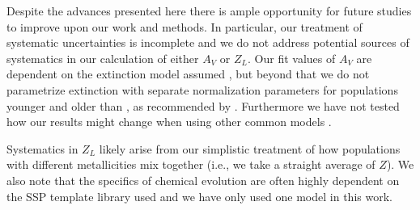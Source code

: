 

Despite the advances presented here there is ample opportunity for
future studies to improve upon our work and methods. In particular,
our treatment of systematic uncertainties is incomplete and we do not
address potential sources of systematics in our calculation of either
$A_V$ or $Z_L$. Our fit values of $A_V$ are dependent on the
extinction model assumed \citep[i.e.,][]{Charlot00}, but beyond that
we do not parametrize extinction with separate normalization
parameters for populations younger and older than ,
as recommended by \citet{Charlot00}. Furthermore we have not tested
how our results might change when using other common models
\citep[e.g.,][]{Calzetti94}.

Systematics in $Z_L$ likely arise from our simplistic treatment of how
populations with different metallicities mix together (i.e., we take a
straight average of $Z$). We also note that the specifics of chemical
evolution are often highly dependent on the SSP template library used
and we have only used one model  in this work.


